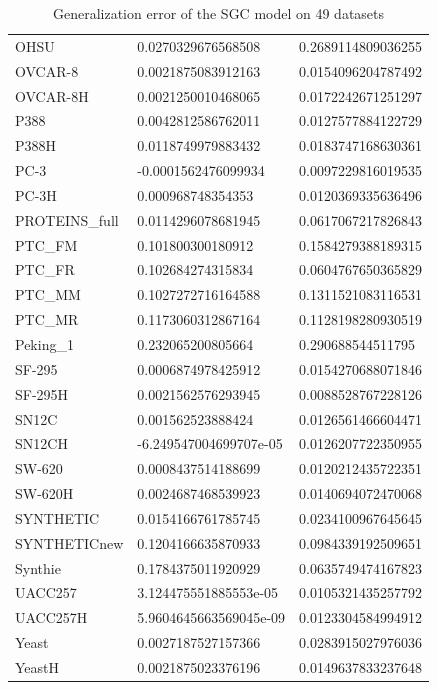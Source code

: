 \begin{table}[!ht]
\begin{tabular}{p{3.5cm}|p{5cm}p{5cm}}
        OHSU & 0.0270329676568508 & 0.2689114809036255 \\
        OVCAR-8 & 0.0021875083912163 & 0.0154096204787492 \\
        OVCAR-8H & 0.0021250010468065 & 0.0172242671251297 \\
        P388 & 0.0042812586762011 & 0.0127577884122729 \\
        P388H & 0.0118749979883432 & 0.0183747168630361 \\
        PC-3 & -0.0001562476099934 & 0.0097229816019535 \\
        PC-3H & 0.000968748354353 & 0.0120369335636496 \\
        PROTEINS\_full & 0.0114296078681945 & 0.0617067217826843 \\
        PTC\_FM & 0.101800300180912 & 0.1584279388189315 \\
        PTC\_FR & 0.102684274315834 & 0.0604767650365829 \\
        PTC\_MM & 0.1027272716164588 & 0.1311521083116531 \\
        PTC\_MR & 0.1173060312867164 & 0.1128198280930519 \\
        Peking\_1 & 0.232065200805664 & 0.290688544511795 \\
        SF-295 & 0.0006874978425912 & 0.0154270688071846 \\
        SF-295H & 0.0021562576293945 & 0.0088528767228126 \\
        SN12C & 0.001562523888424 & 0.0126561466604471 \\
        SN12CH & -6.249547004699707e-05 & 0.0126207722350955 \\
        SW-620 & 0.0008437514188699 & 0.0120212435722351 \\
        SW-620H & 0.0024687468539923 & 0.0140694072470068 \\
        SYNTHETIC & 0.0154166761785745 & 0.0234100967645645 \\
        SYNTHETICnew & 0.1204166635870933 & 0.0984339192509651 \\
        Synthie & 0.1784375011920929 & 0.0635749474167823 \\
        UACC257 & 3.124475551885553e-05 & 0.0105321435257792 \\
        UACC257H & 5.9604645663569045e-09 & 0.0123304584994912 \\
        Yeast & 0.0027187527157366 & 0.0283915027976036 \\
        YeastH & 0.0021875023376196 & 0.0149637833237648 \\
    \bottomrule
    \end{tabular}
    \caption{Generalization error of the SGC model on 49 datasets}
    \label{tab:ge_sgc} %
\end{table}

